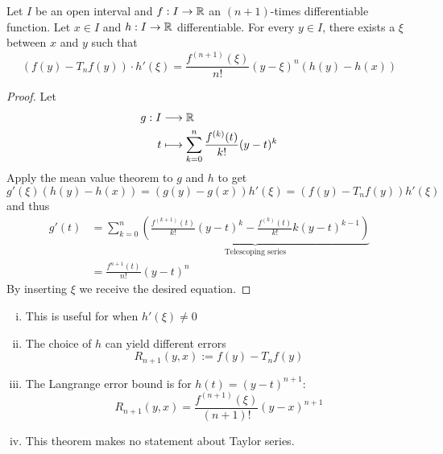 \documentclass[../../script.tex]{subfiles}
\begin{document}
\begin{thm}
    Let $I$ be an open interval and $f: I \rightarrow \mathbb{R}$ an $(n+1)$-times differentiable function.
    Let $x \in I$ and $h: I \rightarrow \mathbb{R}$ differentiable. For every $y \in I$, there exists a $\xi$ between $x$ and $y$ such that 
    \[
        (f(y) - T_n f(y)) \cdot h'(\xi) = \frac{f^{(n+1)}(\xi)}{n!} (y - \xi)^n (h(y) - h(x))
    \]
\end{thm}
\begin{proof}
    Let 
    \begin{equation}
    \begin{split}
        g: I &\longrightarrow \mathbb{R} \\
        t &\longmapsto \sum_{k=0}^n \frac{f^{(k)}(t)}{k!} (y-t)^k
    \end{split}
    \end{equation}
    Apply the mean value theorem to $g$ and $h$ to  get 
    \begin{equation}
        g'(\xi)(h(y) - h(x)) = (g(y) - g(x))h'(\xi) = (f(y) - T_nf(y))h'(\xi)
    \end{equation}
    and thus 
    \begin{equation}
    \begin{split}
        g'(t) &= \sum_{k=0}^n \underbrace{\left( \frac{f^{(k+1)}(t)}{k!} (y-t)^k - \frac{f^{(k)}(t)}{k!}k(y - t)^{k-1} \right)}_{\text{Telescoping series}} \\
        &= \frac{f^{n+1}(t)}{n!} (y-t)^n
    \end{split}
    \end{equation}
    By inserting $\xi$ we receive the desired equation.
\end{proof}

\begin{rem}
    \begin{enumerate}[(i)]
        \item This is useful for when $h'(\xi) \ne 0$
        \item The choice of $h$ can yield different errors
        \[
            R_{n+1}(y, x) := f(y) - T_nf(y)
        \]
        \item The Langrange error bound is for $h(t) = (y - t)^{n+1}$:
        \[
            R_{n+1}(y, x) = \frac{f^{(n+1)}(\xi)}{(n+1)!} (y-x)^{n+1}
        \]
        \item This theorem makes no statement about Taylor series.
    \end{enumerate}
\end{rem}
\end{document}

